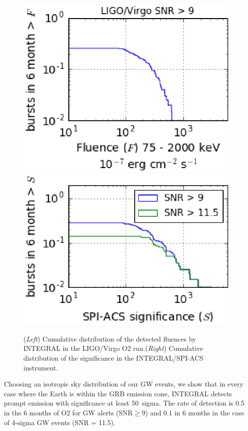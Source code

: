 \documentclass[11pt]{article}
\begin{document}
\begin{figure}
	\centering
    \includegraphics[scale=.6]{FL_f3.eps}
    \includegraphics[scale=.6]{SD_f3.eps}
    \caption{(\textit{Left}) Cumulative distribution of the
      detected fluences by INTEGRAL in the LIGO/Virgo O2
      run.(\textit{Right}) Cumulative distribution of the significance
      in the INTEGRAL/SPI-ACS instrument.}
    \label{fluence_significance}
\end{figure}

Choosing an isotropic sky distribution of our GW events, we show that
in every case where the Earth is within the GRB emission cone,
INTEGRAL detects prompt emission with significance at least 50~sigma.
The rate of detection is 0.5 in the 6 months of O2 for GW alerts ($\mathrm{SNR} \geq 9$) 
and 0.1 in 6 months  in the case of 4-sigma GW events (SNR = 11.5).
\end{document}
